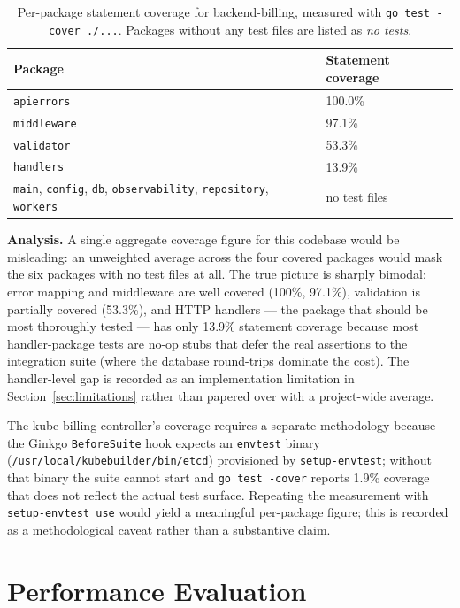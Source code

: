 \begin{table}[h]
\centering
\caption{Per-package statement coverage for backend-billing, measured with \texttt{go test -cover ./...}. Packages without any test files are listed as \emph{no tests}.}
\label{tab:coverage-backend}
\small\begin{tabularx}{\textwidth}{@{}lX@{}}
\toprule
\textbf{Package} & \textbf{Statement coverage} \\ \midrule
\texttt{apierrors}                   & 100.0\% \\
\texttt{middleware}                  & 97.1\% \\
\texttt{validator}                   & 53.3\% \\
\texttt{handlers}                    & 13.9\% \\
\texttt{main}, \texttt{config}, \texttt{db}, \texttt{observability}, \texttt{repository}, \texttt{workers} & no test files \\
\bottomrule
\end{tabularx}
\end{table}

\textbf{Analysis.} A single aggregate coverage figure for this codebase would be misleading: an unweighted average across the four covered packages would mask the six packages with no test files at all. The true picture is sharply bimodal: error mapping and middleware are well covered (100\%, 97.1\%), validation is partially covered (53.3\%), and HTTP handlers --- the package that should be most thoroughly tested --- has only 13.9\% statement coverage because most handler-package tests are no-op stubs that defer the real assertions to the integration suite (where the database round-trips dominate the cost). The handler-level gap is recorded as an implementation limitation in Section~\ref{sec:limitations} rather than papered over with a project-wide average.

The kube-billing controller's coverage requires a separate methodology because the Ginkgo \texttt{BeforeSuite} hook expects an \texttt{envtest} binary (\texttt{/usr/local/kubebuilder/bin/etcd}) provisioned by \texttt{setup-envtest}; without that binary the suite cannot start and \texttt{go test -cover} reports 1.9\% coverage that does not reflect the actual test surface. Repeating the measurement with \texttt{setup-envtest use} would yield a meaningful per-package figure; this is recorded as a methodological caveat rather than a substantive claim.

\section{Performance Evaluation}


